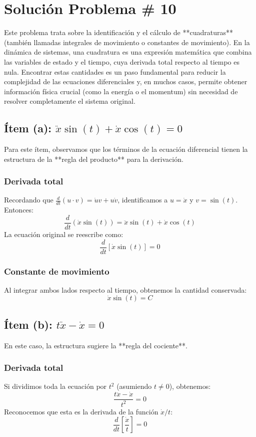 \documentclass[a4paper]{article}
\begin{document}
\section*{Solución Problema \# 10}

Este problema trata sobre la identificación y el cálculo de **cuadraturas** (también llamadas integrales de movimiento o constantes de movimiento). En la dinámica de sistemas, una cuadratura es una expresión matemática que combina las variables de estado y el tiempo, cuya derivada total respecto al tiempo es nula. Encontrar estas cantidades es un paso fundamental para reducir la complejidad de las ecuaciones diferenciales y, en muchos casos, permite obtener información física crucial (como la energía o el momentum) sin necesidad de resolver completamente el sistema original.

\subsection{Ítem (a): $\ddot{x} \sin(t) + \dot{x} \cos(t) = 0$}

Para este ítem, observamos que los términos de la ecuación diferencial tienen la estructura de la **regla del producto** para la derivación.

\subsubsection{Derivada total}
Recordando que $\frac{d}{dt}(u \cdot v) = \dot{u}v + u\dot{v}$, identificamos a $u = \dot{x}$ y $v = \sin(t)$.
Entonces:
$$ \frac{d}{dt} (\dot{x} \sin(t)) = \ddot{x} \sin(t) + \dot{x} \cos(t) $$
La ecuación original se reescribe como:
$$ \frac{d}{dt} [\dot{x} \sin(t)] = 0 $$

\subsubsection{Constante de movimiento}
Al integrar ambos lados respecto al tiempo, obtenemos la cantidad conservada:
$$ \dot{x} \sin(t) = C $$

\subsection{Ítem (b): $t\ddot{x} - \dot{x} = 0$}

En este caso, la estructura sugiere la **regla del cociente**.

\subsubsection{Derivada total}
Si dividimos toda la ecuación por $t^2$ (asumiendo $t \neq 0$), obtenemos:
$$ \frac{t\ddot{x} - \dot{x}}{t^2} = 0 $$
Reconocemos que esta es la derivada de la función $\dot{x}/t$:
$$ \frac{d}{dt} \left[ \frac{\dot{x}}{t} \right] = 0 $$
\end{document}
